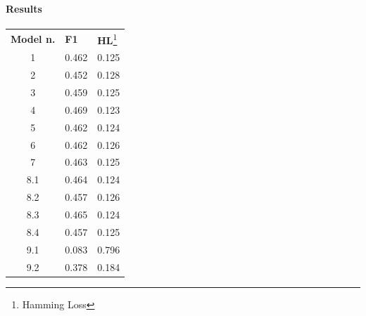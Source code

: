 \begin{frame}
	\frametitle{\secttitle}
	\framesubtitle{Results}
	\begin{table}[]
\centering
\label{my-label}
\begin{tabular}{cll}
\multicolumn{1}{l}{\textbf{Model n.}} & \textbf{F1} & \textbf{HL}\footnote{Hamming Loss} \\
1                                                & 0.462       & 0.125                 \\
2                                                & 0.452       & 0.128                 \\
3                                                & 0.459       & 0.125                 \\
4                                                & 0.469       & 0.123                 \\
5                                                & 0.462       & 0.124                 \\
6                                                & 0.462       & 0.126                 \\
7                                                & 0.463       & 0.125                 \\
8.1                                              & 0.464       & 0.124                 \\
8.2                                              & 0.457       & 0.126                 \\
8.3                                              & 0.465       & 0.124                 \\
8.4                                              & 0.457       & 0.125                 \\
9.1                                              & 0.083       & 0.796                 \\
9.2                                              & 0.378       & 0.184                
\end{tabular}
\end{table}
\end{frame}

